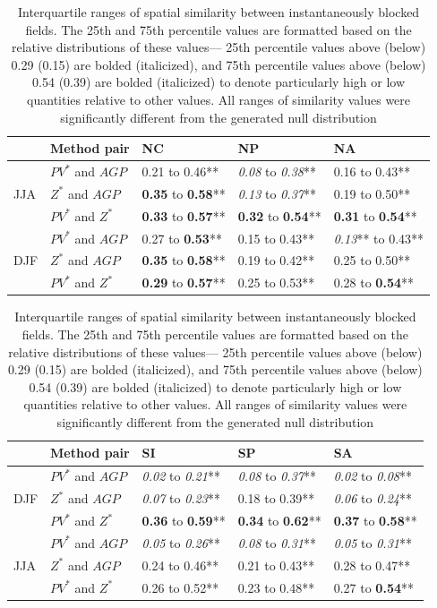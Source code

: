 \documentclass[smallextended]{svjour3}       %
\numberwithin{equation}{section}
\begin{document}
\begin{table}
\centering

\caption{ Interquartile ranges of spatial similarity between instantaneously blocked fields. {\color{blue}The 25th and 75th percentile values are formatted based on the relative distributions of these values--- 25th percentile values above (below) 0.29 (0.15) are bolded (italicized), and 75th percentile values above (below) 0.54 (0.39) are bolded (italicized) to denote particularly high or low quantities relative to other values. All ranges of similarity values were significantly different from the generated null distribution}}
\label{simtabcol}
\begin{tabular}{|l|l|l|l|l|}
\hline
  & Method pair & NC    & NP    & NA    \\ \hline
\multirow{3}{*}{JJA} 
   & $PV^* $ and $AGP$    & {0.21} to {0.46}** & \textit{0.08} to \textit{0.38}** & {0.16} to {0.43}**  \\  
   & $Z^*$ and $AGP$   & \textbf{0.35} to \textbf{0.58}** & \textit{0.13} to \textit{0.37}** & {0.19} to {0.50}**  \\   
   & $PV^*$ and $Z^*$   & \textbf{0.33} to \textbf{0.57}** & \textbf{0.32} to \textbf{0.54}** & \textbf{0.31} to \textbf{0.54}**  \\ 
   \hline
\multirow{3}{*}{DJF}
  & $PV^*$ and $AGP$ & {0.27} to \textbf{0.53}** & {0.15} to {0.43}** & \textit{0.13}** to {0.43}** \\   
  & $Z^*$ and $AGP$ & \textbf{0.35} to \textbf{0.58}** & {0.19} to {0.42}** & 0.25 to {0.50}** \\ 
  & $PV^*$ and $Z^*$   & \textbf{0.29} to \textbf{0.57}** & {0.25} to {0.53}** & {0.28} to \textbf{0.54}** \\  
  \hline
\end{tabular}
\begin{tabular}{|l|l|l|l|l|}
\hline
  & Method pair & SI    & SP    & SA      \\ \hline

\multirow{3}{*}{DJF}
  & $PV^*$ and $AGP$  & \textit{0.02} to \textit{0.21}** & \textit{0.08} to \textit{0.37}** & \textit{0.02} to \textit{0.08}** \\   
  & $Z^*$ and $AGP$ & \textit{0.07} to \textit{0.23}** & {0.18} to {0.39}** & \textit{0.06} to \textit{0.24}** \\ 
  & $PV^*$ and $Z^*$  & \textbf{0.36} to \textbf{0.59}** & \textbf{0.34} to \textbf{0.62}** & \textbf{0.37} to \textbf{0.58}** \\  
  \hline
  \multirow{3}{*}{JJA} 
   & $PV^* $ and $AGP$    & \textit{0.05} to \textit{0.26}** & \textit{0.08} to \textit{0.31}** & \textit{0.05} to \textit{0.31}** \\  
   & $Z^*$ and $AGP$   & {0.24} to {0.46}** & {0.21} to {0.43}** & {0.28} to {0.47}** \\   
   & $PV^*$ and $Z^*$   & {0.26} to {0.52}** & {0.23} to {0.48}** & {0.27} to \textbf{0.54}** \\ 
  \hline
\end{tabular}

\end{table}
\end{document}
